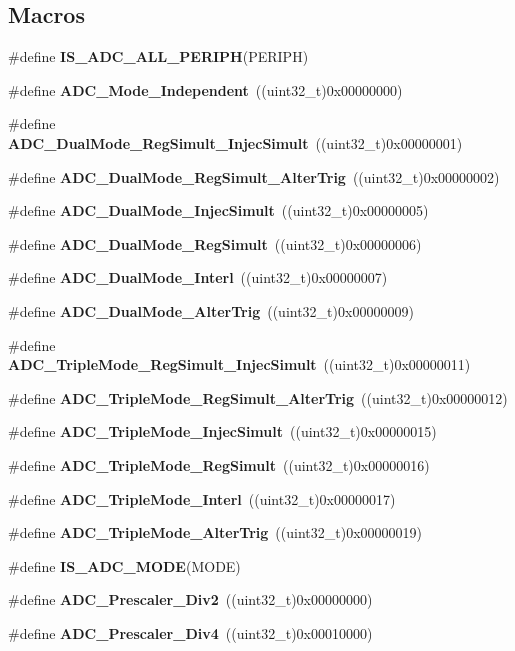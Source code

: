 \subsection*{Macros}
\begin{DoxyCompactItemize}
\item 
\#define \textbf{ I\+S\+\_\+\+A\+D\+C\+\_\+\+A\+L\+L\+\_\+\+P\+E\+R\+I\+PH}(P\+E\+R\+I\+PH)
\item 
\#define \textbf{ A\+D\+C\+\_\+\+Mode\+\_\+\+Independent}~((uint32\+\_\+t)0x00000000)
\item 
\#define \textbf{ A\+D\+C\+\_\+\+Dual\+Mode\+\_\+\+Reg\+Simult\+\_\+\+Injec\+Simult}~((uint32\+\_\+t)0x00000001)
\item 
\#define \textbf{ A\+D\+C\+\_\+\+Dual\+Mode\+\_\+\+Reg\+Simult\+\_\+\+Alter\+Trig}~((uint32\+\_\+t)0x00000002)
\item 
\#define \textbf{ A\+D\+C\+\_\+\+Dual\+Mode\+\_\+\+Injec\+Simult}~((uint32\+\_\+t)0x00000005)
\item 
\#define \textbf{ A\+D\+C\+\_\+\+Dual\+Mode\+\_\+\+Reg\+Simult}~((uint32\+\_\+t)0x00000006)
\item 
\#define \textbf{ A\+D\+C\+\_\+\+Dual\+Mode\+\_\+\+Interl}~((uint32\+\_\+t)0x00000007)
\item 
\#define \textbf{ A\+D\+C\+\_\+\+Dual\+Mode\+\_\+\+Alter\+Trig}~((uint32\+\_\+t)0x00000009)
\item 
\#define \textbf{ A\+D\+C\+\_\+\+Triple\+Mode\+\_\+\+Reg\+Simult\+\_\+\+Injec\+Simult}~((uint32\+\_\+t)0x00000011)
\item 
\#define \textbf{ A\+D\+C\+\_\+\+Triple\+Mode\+\_\+\+Reg\+Simult\+\_\+\+Alter\+Trig}~((uint32\+\_\+t)0x00000012)
\item 
\#define \textbf{ A\+D\+C\+\_\+\+Triple\+Mode\+\_\+\+Injec\+Simult}~((uint32\+\_\+t)0x00000015)
\item 
\#define \textbf{ A\+D\+C\+\_\+\+Triple\+Mode\+\_\+\+Reg\+Simult}~((uint32\+\_\+t)0x00000016)
\item 
\#define \textbf{ A\+D\+C\+\_\+\+Triple\+Mode\+\_\+\+Interl}~((uint32\+\_\+t)0x00000017)
\item 
\#define \textbf{ A\+D\+C\+\_\+\+Triple\+Mode\+\_\+\+Alter\+Trig}~((uint32\+\_\+t)0x00000019)
\item 
\#define \textbf{ I\+S\+\_\+\+A\+D\+C\+\_\+\+M\+O\+DE}(M\+O\+DE)
\item 
\#define \textbf{ A\+D\+C\+\_\+\+Prescaler\+\_\+\+Div2}~((uint32\+\_\+t)0x00000000)
\item 
\#define \textbf{ A\+D\+C\+\_\+\+Prescaler\+\_\+\+Div4}~((uint32\+\_\+t)0x00010000)

\end{DoxyCompactItemize}
